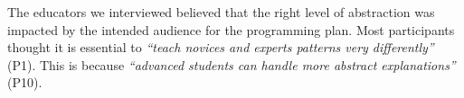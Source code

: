 The educators we interviewed believed that the right level of abstraction was impacted by the intended audience for the programming plan. 
Most participants thought it is essential to \textit{``teach novices and experts patterns very differently''} (P1). This is because \textit{``advanced students can handle more abstract explanations''} (P10). 













